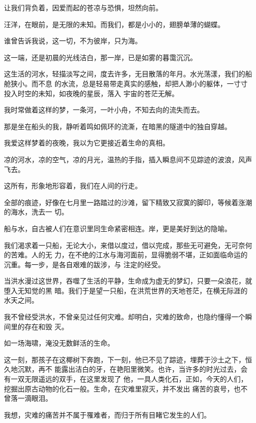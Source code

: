 \documentclass[12pt,a4paper]{article}
\begin{document}
		让我们背负着，因爱而起的苍凉与恐惧，坦然向前。

		汪洋，在眼前，是无限的未知。而我们，都是小小的，翅膀单薄的蝴蝶。


		谁曾告诉我说，这一切，不为彼岸，只为海。

	\endwriting



		这一端，还是初晨的光线洁白，那一岸，已是如雾的暮霭沉沉。


		这生活的河水，轻描淡写之间，度去许多，无目散落的年月。水光荡漾，我们的船舱狭小。而不息
	的水流，总是轻易带走真实的感触，却把人渺小的躯体，一寸寸投入时空的未知，如夜晚的星辰，落入
	宇宙的苍茫无解。


		我时常做着这样的梦，一条河，一叶小舟，不知去向的流失而去。

		那是坐在船头的我，静听着鸣如佩环的流澌，在暗黑的隧道中的独自穿越。

		我爱这样梦着的夜晚，我以为它更接近着生命的真相。


		凉的河水，凉的空气，凉的月光，温热的手指，插入瞬息间不见踪迹的波浪，风声飞去。

		这所有，形象地形容着，我们在人间的行走。


		全部的痕迹，好像在七月里一路踏过的沙滩，留下精致又寂寞的脚印，等候着涨潮的海水，洗去一
	切。


		船与水，自古被人们在意识里同生命紧密相连。岸，更是美好到达的隐喻。

		我们渴求着一只船，无论大小，来借以度过，借以完成，那些无可避免，无可奈何的苦难。人的无
	力，在不绝的江水与海河面前，显得脆弱不堪，正如面临命运的沉重。每一步，是各自艰难的跋涉，与
	注定的经受。

		当洪水漫过这世界，吞噬了生活的平静，生命成为虚无的梦幻，只要一朵浪花，就堕入无知觉的黑
	暗。我们于是望一只船，在洪荒世界的天地苍茫，在横无际涯的水天之间。


		我不曾经受洪水，不曾亲见过任何灾难。却明白，灾难的致命，也隐约懂得一个瞬间里的存在和毁
	灭。

		如一场海啸，淹没无数鲜活的生命。

		这一刻，那孩子在这椰树下奔跑，下一刻，他已不见了踪迹，埋葬于沙土之下，恒久地沉默，再不
	能露出洁白的牙，在艳阳里微笑。也许，当许多的时光过去，会有一双无限遥远的双手，在这里发现了
	他，一具人类化石，正如，今天的人们，挖掘出原古动物的化石一般。生命，在灾难里寂灭，并不发出
	痛苦的哀号，也不曾落一滴眼泪。

		我想，灾难的痛苦并不属于罹难者，而归于所有目睹它发生的人们。
\end{document}
